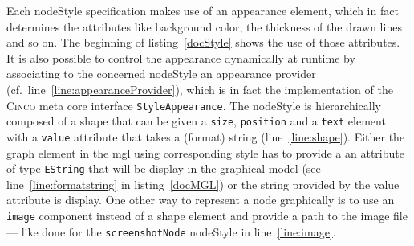 Each nodeStyle specification makes use of an appearance element, which in fact determines the attributes like background color, the thickness of the drawn lines and so on. The beginning of listing~\ref{docStyle} shows the use of those attributes. It is also possible to control the appearance dynamically at runtime by associating to the concerned nodeStyle an appearance provider (cf.\ line~\ref{line:appearanceProvider}), which is in fact the implementation of the \textsc{Cinco} meta core interface \lstinline{StyleAppearance}. The nodeStyle is hierarchically composed of a shape that can be given a \lstinline[language=MGL]{size}, \lstinline[language=MGL]{position} and a \lstinline[language=MGL]{text} element with a \lstinline[language=MGL]{value} attribute that takes a (format) string (line~\ref{line:shape}). Either the graph element in the \acrshort{mgl} using corresponding style has to provide a an attribute of type \lstinline{EString} that will be display in the graphical model (see line~\ref{line:formatstring} in listing~\ref{docMGL}) or the string provided by the value attribute is display. One other way to represent a node graphically is to use an \lstinline[language=MGL]{image} component instead of a shape element and provide a path to the image file --- like done for the \lstinline{screenshotNode} nodeStyle in line~\ref{line:image}.

